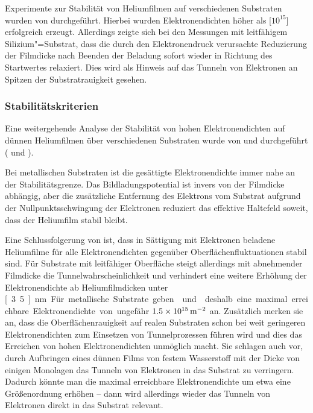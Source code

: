 Experimente zur Stabilität von Heliumfilmen auf verschiedenen Substraten wurden von  \ea{} \cite{Etz84} durchgeführt. Hierbei wurden Elektronendichten höher als \unit[$10^{15}$]{\Em} erfolgreich erzeugt. Allerdings zeigte sich bei den Messungen mit leitfähigem Silizium"=Substrat, dass die durch den Elektronendruck verursachte Reduzierung der Filmdicke nach Beenden der Beladung sofort wieder in Richtung des Startwertes relaxiert. Dies wird als Hinweis auf das Tunneln von Elektronen an Spitzen der Substratrauigkeit gesehen.

\subsubsection{Stabilitätskriterien}
Eine weitergehende Analyse der Stabilität von hohen Elektronendichten auf dünnen Heliumfilmen über verschiedenen Substraten wurde von  und  durchgeführt (\cite{Hu90} und \cite{Dah91}).

Bei metallischen Substraten ist die gesättigte Elektronendichte immer nahe an der Stabilitätsgrenze. Das Bildladungspotential ist invers von der Filmdicke abhängig, aber die zusätzliche Entfernung des Elektrons vom Substrat aufgrund der Nullpunktsschwingung der Elektronen reduziert das effektive Haltefeld soweit, dass der Heliumfilm stabil bleibt.

Eine Schlussfolgerung von \cite{Hu90} ist, dass in Sättigung mit Elektronen beladene Heliumfilme für alle Elektronendichten gegenüber Oberflächenfluktuationen stabil sind. Für Substrate mit leitfähiger Oberfläche steigt allerdings mit abnehmender Filmdicke die Tunnelwahrscheinlichkeit und verhindert eine weitere Erhöhung der Elektronendichte ab Heliumfilmdicken unter \unit[3.5]{nm}. Für metallische Substrate geben  und  deshalb eine maximal erreichbare Elektronendichte von ungefähr $\unit[1.5\times10^{15}]{\Em}$ an. Zusätzlich merken sie an, dass die Oberflächenrauigkeit auf realen Substraten schon bei weit geringeren Elektronendichten zum Einsetzen von Tunnelprozessen führen wird und dies das Erreichen von hohen Elektronendichten unmöglich macht. Sie schlagen auch vor, durch Aufbringen eines dünnen Films von festem Wasserstoff mit der Dicke von einigen Monolagen das Tunneln von Elektronen in das Substrat zu verringern. Dadurch könnte man die maximal erreichbare Elektronendichte um etwa eine Größenordnung erhöhen -- dann wird allerdings wieder das Tunneln von Elektronen direkt in das Substrat relevant.
